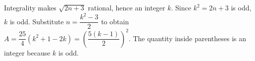 Integrality makes $\sqrt{2n+3}$ rational, hence an integer $k$. Since $k^2=2n+3$ is odd, $k$ is odd. Substitute $n=\dfrac{k^2-3}{2}$ to obtain $A=\dfrac{25}{4}(k^2+1-2k)=\left(\dfrac{5(k-1)}{2}\right)^2$. The quantity inside parentheses is an integer because $k$ is odd.
